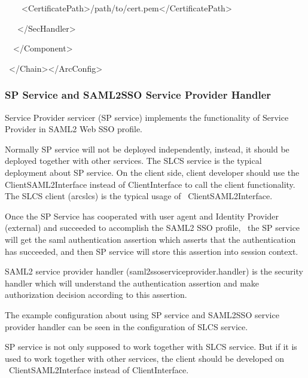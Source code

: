 \documentclass{article}
\begin{document}
{\ttfamily\color{black}
\ \ \ \ {\textless}CertificatePath{\textgreater}/path/to/cert.pem{\textless}/CertificatePath{\textgreater}}

{\ttfamily\color{black}
\ \ \ {\textless}/SecHandler{\textgreater}}

{\ttfamily\color{black}
\ \ {\textless}/Component{\textgreater}}

{\ttfamily\color{black}
\ {\textless}/Chain{\textgreater}{\textless}/ArcConfig{\textgreater}}

\subsubsection{SP Service and SAML2SSO Service Provider Handler}
{\color{black}
Service Provider servicer (SP service) implements the functionality of
Service Provider in SAML2 Web SSO profile. }

{\color{black}
Normally SP service will not be deployed independently, instead, it
should be deployed together with other services. The SLCS service is
the typical deployment about SP service. On the client side, client
developer should use the ClientSAML2Interface instead of
ClientInterface to call the client functionality. The SLCS client
(arcslcs) is the typical usage of \ ClientSAML2Interface.}

{\color{black}
Once the SP Service has cooperated with user agent and Identity Provider
(external) and succeeded to accomplish the SAML2 SSO profile, \ the SP
service will get the saml authentication assertion which asserts that
the authentication has succeeded, and then SP service will store this
assertion into session context.}

{\color{black}
SAML2 service provider handler (saml2ssoserviceprovider.handler) is the
security handler which will understand the authentication assertion and
make authorization decision according to this assertion.}

{\color{black}
The example configuration about using SP service and SAML2SSO service
provider handler can be seen in the configuration of SLCS service. }

{\color{black}
SP service is not only supposed to work together with SLCS service. But
if it is used to work together with other services, the client should
be developed on \ ClientSAML2Interface instead of ClientInterface.}
\end{document}
